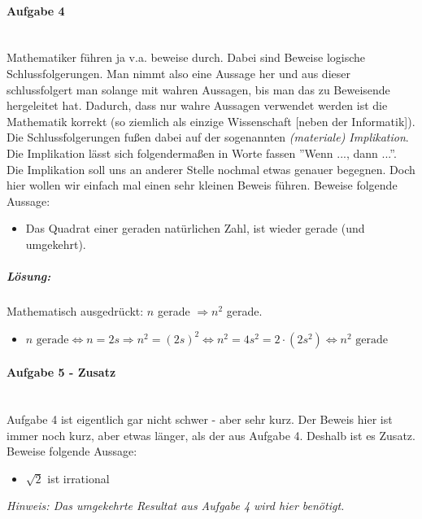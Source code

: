 \documentclass[12pt,a4paper,ngerman]{scrartcl}
\begin{document}
	\paragraph{Aufgabe 4}\mbox{}\\	
	Mathematiker führen ja v.a. beweise durch. Dabei sind Beweise logische Schlussfolgerungen. Man nimmt also eine Aussage her und aus dieser schlussfolgert man solange mit wahren Aussagen, bis man das zu Beweisende hergeleitet hat. Dadurch, dass nur wahre Aussagen verwendet werden ist die Mathematik korrekt (so ziemlich als einzige Wissenschaft [neben der Informatik]). Die Schlussfolgerungen fußen dabei auf der sogenannten \emph{(materiale) Implikation}. Die Implikation lässt sich folgendermaßen in Worte fassen ''Wenn ..., dann ...''. Die Implikation soll uns an anderer Stelle nochmal etwas genauer begegnen. Doch hier wollen wir einfach mal einen sehr kleinen Beweis führen. Beweise folgende Aussage:
	\begin{itemize}
		\item[] Das Quadrat einer geraden natürlichen Zahl, ist wieder gerade (und umgekehrt).
	\end{itemize}
	
	\subparagraph{Lösung:} Mathematisch ausgedrückt: $n$ gerade $\Rightarrow n^2$ gerade.
	\begin{itemize}
		\item[] $n \text{ gerade} 
		\Leftrightarrow n = 2s 
		\Rightarrow n^2 = (2s)^2 
		\Leftrightarrow n^2 = 4s^2 = 2 \cdot (2s^2)
		\Leftrightarrow n^2 \text{ gerade}$
	\end{itemize}
	
	\paragraph{Aufgabe 5 - Zusatz}\mbox{}\\
	Aufgabe 4 ist eigentlich gar nicht schwer - aber sehr kurz. Der Beweis hier ist immer noch kurz, aber etwas länger, als der aus Aufgabe 4. Deshalb ist es Zusatz.
	Beweise folgende Aussage:
	\begin{itemize}
		\item[] $\sqrt{2}$ ist irrational
	\end{itemize}
	\emph{Hinweis: Das umgekehrte Resultat aus Aufgabe 4 wird hier benötigt.}
\end{document}
